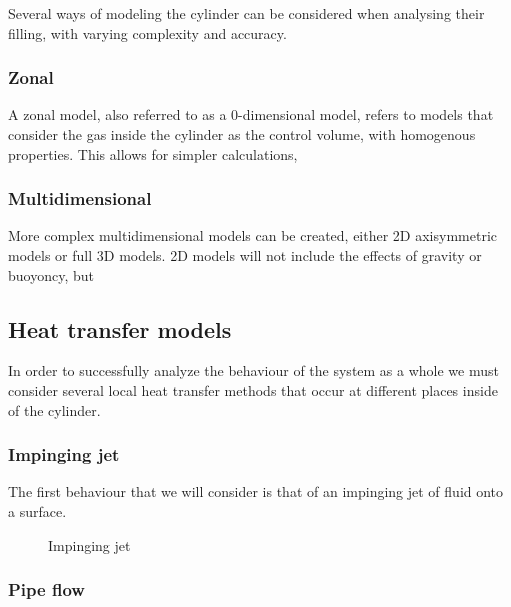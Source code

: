 Several ways of modeling the cylinder can be considered when analysing their filling, with varying complexity and accuracy.

\subsubsection{Zonal}

A zonal model, also referred to as a 0-dimensional model, refers to models that consider the gas inside the cylinder as the control volume, with homogenous properties. This allows for simpler calculations, 

\subsubsection{Multidimensional}

More complex multidimensional models can be created, either 2D axisymmetric models or full 3D models. 2D models will not include the effects of gravity or buoyoncy, but 

\label{sec:multidimensional}

\subsection{Heat transfer models}

In order to successfully analyze the behaviour of the system as a whole we must consider several local heat transfer methods that occur at different places inside of the cylinder.



\subsubsection{Impinging jet}

 The first behaviour that we will consider is that of an impinging jet of fluid onto a surface. 
 
 
 \begin{figure}[h]
\begin{centering}
\caption{Impinging jet}
\label{fig:inpinging_jet}
\end{centering}
\end{figure}


 
\subsubsection{Pipe flow}

